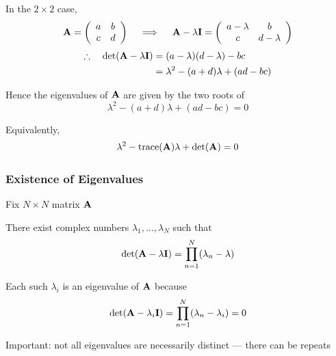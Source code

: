 \begin{frame}
    
    \vspace{2em}
    \Eg In the $2 \times 2$ case,
    \begin{equation*}
        \mathbf A =
        \left(
        \begin{array}{cc}
            a & b  \\
            c & d  \\
        \end{array}
        \right)
        \quad \implies \quad
        \mathbf A - \lambda \mathbf I =
        \left(
        \begin{array}{cc}
            a - \lambda & b  \\
            c & d - \lambda 
        \end{array}
        \right)
    \end{equation*}
    \begin{align*}
        \therefore \quad
    \det(\mathbf A - \lambda \mathbf I) 
    & = (a - \lambda)(d - \lambda) - bc
    \\
    & = \lambda^2 - (a + d) \lambda + (ad - bc)
    \end{align*}
    
    Hence the eigenvalues of $\mathbf A$ are given by the two roots of 
    \begin{equation*}
        \lambda^2 - (a + d) \lambda + (ad - bc) = 0
    \end{equation*}
    
    \vspace{.7em}
    Equivalently,
    \begin{equation*}
        \lambda^2 - \operatorname{trace}(\mathbf A) \lambda + \det(\mathbf A) = 0
    \end{equation*}
    
\end{frame}


\begin{frame}

    \frametitle{Existence of Eigenvalues}

    \vspace{2em}
    Fix $N \times N$ matrix $\mathbf A$ 

    \vspace{0.5em}
    
    \Fact There exist complex numbers $\lambda_1, \ldots, \lambda_N$ such that
    \begin{equation*}
        \det(\mathbf A - \lambda \mathbf I) = \prod_{n=1}^N (\lambda_n - \lambda)
    \end{equation*}

    Each such $\lambda_i$  is an eigenvalue of $\mathbf A$ because
    \begin{equation*}
        \det(\mathbf A - \lambda_i \mathbf I) 
        = \prod_{n=1}^N (\lambda_n - \lambda_i) 
        = 0
    \end{equation*}
    
    Important: not all eigenvalues are necessarily distinct --- there can be repeats

\end{frame}

